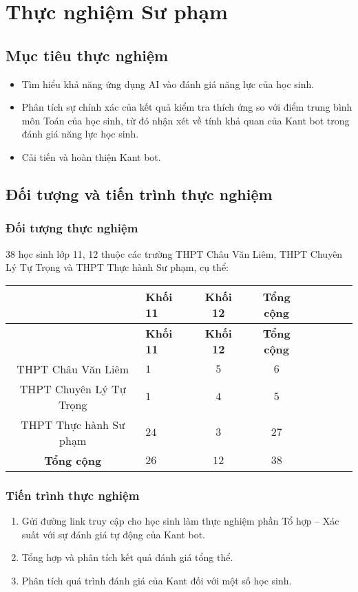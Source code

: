 \chapter{Thực nghiệm Sư phạm}

\section{Mục tiêu thực nghiệm}\begin{itemize}
	\item Tìm hiểu khả năng ứng dụng AI vào đánh giá năng lực của học sinh.
	\item Phân tích sự chính xác của kết quả kiểm tra thích ứng so với điểm trung bình môn Toán của học sinh, từ đó nhận xét về tính khả quan của Kant bot trong đánh giá năng lực học sinh.
	\item Cải tiến và hoàn thiện Kant bot.
\end{itemize}

\section{Đối tượng và tiến trình thực nghiệm}
\subsection{Đối tượng thực nghiệm}
	38 học sinh lớp 11, 12 thuộc các trường THPT Châu Văn Liêm, THPT Chuyên Lý Tự Trọng và THPT Thực hành Sư phạm, cụ thể:
	\begin{longtable}{SlScScSc}
		& \textbf{Khối 11} & \textbf{Khối 12} & \textbf{Tổng cộng} \\ \hline\endfirsthead
		& \textbf{Khối 11} & \textbf{Khối 12} & \textbf{Tổng cộng} \\ \hline\endhead\hline\endfoot
		THPT Châu Văn Liêm & $1$ & $5$ & $6$\\
		THPT Chuyên Lý Tự Trọng & $1$ & $4$ & $5$\\
		THPT Thực hành Sư phạm & $24$ & $3$ & $27$\\\hline
		\textbf{Tổng cộng}     & $26$ & $12$ & $38$\\
	\end{longtable}
\subsection{Tiến trình thực nghiệm}
\begin{enumerate}[label=\textbf{Giai đoạn \arabic*.},align=left,left=0cm..0cm,itemindent=*]
	\item Gửi đường link truy cập cho học sinh làm thực nghiệm phần Tổ hợp – Xác suất với sự đánh giá tự động của Kant bot.
	\item Tổng hợp và phân tích kết quả đánh giá tổng thể.
	\item Phân tích quá trình đánh giá của Kant đối với một số học sinh.
\end{enumerate}

